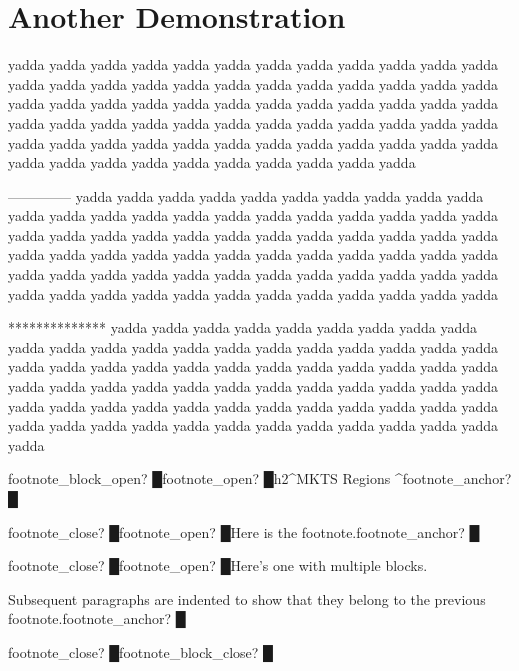 \chapter{Another Demonstration
}
\begin{multicols}{2}yadda yadda yadda yadda yadda yadda yadda yadda yadda yadda
yadda yadda yadda yadda yadda yadda yadda yadda yadda yadda
yadda yadda yadda yadda yadda yadda yadda yadda yadda yadda
yadda yadda yadda yadda yadda yadda yadda yadda yadda yadda
yadda yadda yadda yadda yadda yadda yadda yadda yadda yadda
yadda yadda yadda yadda yadda yadda yadda yadda yadda yadda
yadda yadda yadda yadda yadda yadda yadda yadda yadda yadda\mktsShowpar\par

--------------
yadda yadda yadda yadda yadda yadda yadda yadda yadda yadda
yadda yadda yadda yadda yadda yadda yadda yadda yadda yadda
yadda yadda yadda yadda yadda yadda yadda yadda yadda yadda
yadda yadda yadda yadda yadda yadda yadda yadda yadda yadda
yadda yadda yadda yadda yadda yadda yadda yadda yadda yadda
yadda yadda yadda yadda yadda yadda yadda yadda yadda yadda
yadda yadda yadda yadda yadda yadda yadda yadda yadda yadda\mktsShowpar\par

**************
yadda yadda yadda yadda yadda yadda yadda yadda yadda yadda
yadda yadda yadda yadda yadda yadda yadda yadda yadda yadda
yadda yadda yadda yadda yadda yadda yadda yadda yadda yadda
yadda yadda yadda yadda yadda yadda yadda yadda yadda yadda
yadda yadda yadda yadda yadda yadda yadda yadda yadda yadda
yadda yadda yadda yadda yadda yadda yadda yadda yadda yadda
yadda yadda yadda yadda yadda yadda yadda yadda yadda yadda\mktsShowpar\par
{\mktsStyleBold\color{violet}{\mktsStyleSymbol}footnote\_block\_open? {\mktsStyleSymbol█}}{\mktsStyleBold\color{violet}{\mktsStyleSymbol}footnote\_open? {\mktsStyleSymbol█}}h2\textasciicircum{}MKTS Regions \textasciicircum{}{\mktsStyleBold\color{violet}{\mktsStyleSymbol}footnote\_anchor? {\mktsStyleSymbol█}}\mktsShowpar\par
{\mktsStyleBold\color{violet}{\mktsStyleSymbol}footnote\_close? {\mktsStyleSymbol█}}{\mktsStyleBold\color{violet}{\mktsStyleSymbol}footnote\_open? {\mktsStyleSymbol█}}Here is the footnote.{\mktsStyleBold\color{violet}{\mktsStyleSymbol}footnote\_anchor? {\mktsStyleSymbol█}}\mktsShowpar\par
{\mktsStyleBold\color{violet}{\mktsStyleSymbol}footnote\_close? {\mktsStyleSymbol█}}{\mktsStyleBold\color{violet}{\mktsStyleSymbol}footnote\_open? {\mktsStyleSymbol█}}Here’s one with multiple blocks.\mktsShowpar\par
Subsequent paragraphs are indented to show that they
belong to the previous footnote.{\mktsStyleBold\color{violet}{\mktsStyleSymbol}footnote\_anchor? {\mktsStyleSymbol█}}\mktsShowpar\par
{\mktsStyleBold\color{violet}{\mktsStyleSymbol}footnote\_close? {\mktsStyleSymbol█}}{\mktsStyleBold\color{violet}{\mktsStyleSymbol}footnote\_block\_close? {\mktsStyleSymbol█}}\end{multicols}
